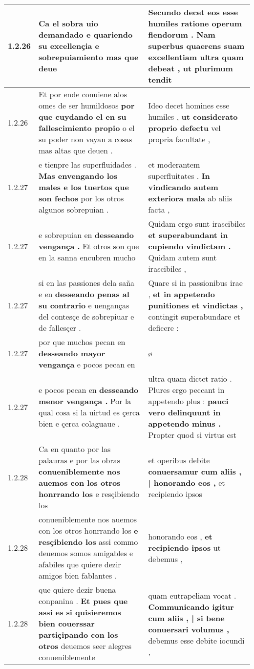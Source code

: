 \begin{tabular}{|p{1cm}|p{6.5cm}|p{6.5cm}|}
1.2.26 & Ca el sobra uio demandado \textbf{ e quariendo su excellençia e sobrepuiamiento } mas que deue & Secundo decet eos esse humiles ratione operum fiendorum . \textbf{ Nam superbus quaerens suam excellentiam ultra quam debeat , } ut plurimum tendit \\\hline
1.2.26 & Et por ende conuiene alos omes de ser humildosos \textbf{ por que cuydando el en su fallescimiento propio } o el su poder non vayan a cosas mas altas que deuen . & Ideo decet homines esse humiles , \textbf{ ut considerato proprio defectu } vel propria facultate , \\\hline
1.2.27 & e tienpre las superfluidades . \textbf{ Mas envengando los males e los tuertos que son fechos } por los otros algunos sobrepuian . & et moderantem superfluitates . \textbf{ In vindicando autem exteriora mala } ab aliis facta , \\\hline
1.2.27 & e sobrepuian en \textbf{ desseando vengança . } Et otros son que en la sanna encubren mucho & Quidam ergo sunt irascibiles \textbf{ et superabundant in cupiendo vindictam . } Quidam autem sunt irascibiles , \\\hline
1.2.27 & si en las passiones dela saña e en \textbf{ desseando penas al su contrario } e uenganças del contesçe de sobrepiuar e de fallesçer . & Quare si in passionibus irae , \textbf{ et in appetendo punitiones et vindictas , } contingit superabundare et deficere : \\\hline
1.2.27 & por que muchos pecan en \textbf{ desseando mayor vengança } e pocos pecan en & ø \\\hline
1.2.27 & e pocos pecan en \textbf{ desseando menor vengança . } Por la qual cosa si la uirtud es çerca bien e çerca colaguaue . & ultra quam dictet ratio . Plures ergo peccant in appetendo plus : \textbf{ pauci vero delinquunt in appetendo minus . } Propter quod si virtus est \\\hline
1.2.28 & Ca en quanto por las palauras e por las obras \textbf{ conueniblemente nos auemos con los otros honrrando los } e resçibiendo los & et operibus debite \textbf{ conuersamur cum aliis , | honorando eos , } et recipiendo ipsos \\\hline
1.2.28 & conueniblemente nos auemos con los otros honrrando los \textbf{ e resçibiendo los } assi commo deuemos somos amigables e afabiles que quiere dezir amigos bien fablantes . & honorando eos , \textbf{ et recipiendo ipsos } ut debemus , \\\hline
1.2.28 & que quiere dezir buena conpanina . \textbf{ Et pues que assi es si quisieremos bien couerssar partiçipando con los otros } deuemos seer alegres conueniblemente & quam eutrapeliam vocat . \textbf{ Communicando igitur cum aliis , | si bene conuersari volumus , } debemus esse debite iocundi , \\\hline

\end{tabular}
